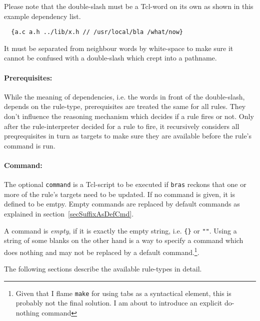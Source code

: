\documentclass[12pt]{article}
\newcommand{\bras}{\texttt{bras}}
\newcommand{\make}{\texttt{make}}
\begin{document}
Please note that the double-slash must be a Tcl-word on its own as
shown in this example dependency list.
\begin{verbatim}
  {a.c a.h ../lib/x.h // /usr/local/bla /what/now}
\end{verbatim}
It must be separated from neighbour words by white-space to make sure
it cannot be confused with a double-slash which crept into a pathname.


\paragraph{Prerequisites:}
While the meaning of dependencies, i.e. the words in front of the
double-slash, depends on the rule-type, prerequisites are treated the
same for all rules. They don't influence the reasoning mechanism which
decides if a rule fires or not. Only after the rule-interpreter
decided for a rule to fire, it recursively considers all
preqrequisites in turn as targets to make sure they are available
before the rule's command is run.

\paragraph{Command:}
The optional \texttt{command} is a Tcl-script to be executed if
\bras{} reckons that one or more of the rule's targets need to be
updated. If no command is given, it is defined to be emtpy. Empty
commands are replaced by default commands as explained in
section~\ref{secSuffixAsDefCmd}. 

A command is \textit{empty}, if it is exactly the empty string,
i.e. \verb+{}+ or \verb+""+. Using a string of some blanks on the
other hand is a way to specify a command which does nothing and may
not be replaced by a default command.\footnote{Given that I flame
\make{} for using tabs as a syntactical element, this is probably not
the final solution. I am about to introduce an explicit do-nothing
command}.

The following sections describe the available rule-types in detail.

\end{document}
